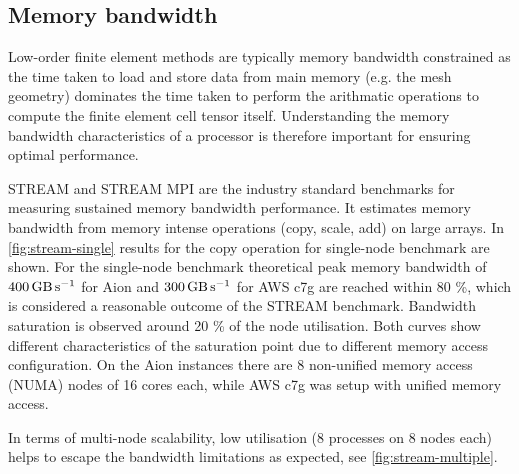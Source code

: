 \subsection*{Memory bandwidth}

Low-order finite element methods are typically memory bandwidth constrained as
the time taken to load and store data from main memory (e.g. the mesh geometry)
dominates the time taken to perform the arithmatic operations to compute the
finite element cell tensor itself. Understanding the memory bandwidth
characteristics of a processor is therefore important for ensuring optimal
performance.

STREAM and STREAM MPI \cite{McCalpin1995,McCalpin2007} are the industry standard
benchmarks for measuring sustained memory bandwidth performance. It estimates
memory bandwidth from memory intense operations (copy, scale, add) on large
arrays. In \autoref{fig:stream-single} results for the copy operation for
single-node benchmark are shown. For the single-node benchmark theoretical peak
memory bandwidth of $\SI{400}{\giga\byte\per\second}$ for Aion and
$\SI{300}{\giga\byte\per\second}$ for AWS c7g are reached within 80 \%, which is
considered a reasonable outcome of the STREAM benchmark. Bandwidth saturation is
observed around 20 \% of the node utilisation. Both curves show different
characteristics of the saturation point due to different memory access
configuration. On the Aion instances there are 8 non-unified memory access
(NUMA) nodes of 16 cores each, while AWS c7g was setup with unified memory
access.

In terms of multi-node scalability, low utilisation (8 processes on 8 nodes
each) helps to escape the bandwidth limitations as expected, see
\autoref{fig:stream-multiple}.

